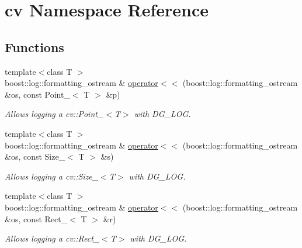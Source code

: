 \hypertarget{namespacecv}{}\section{cv Namespace Reference}
\label{namespacecv}
\subsection*{Functions}
\begin{DoxyCompactItemize}
\item 
{\footnotesize template$<$class T $>$ }\\boost\+::log\+::formatting\+\_\+ostream \& \hyperlink{group___imagery_module_ga4d7a2828ed1d678a96fa0ad0591c4103}{operator$<$$<$} (boost\+::log\+::formatting\+\_\+ostream \&os, const Point\+\_\+$<$ T $>$ \&p)
\begin{DoxyCompactList}\small\item\em Allows logging a cv\+::\+Point\+\_\+$<$\+T$>$ with D\+G\+\_\+\+L\+OG. \end{DoxyCompactList}\item 
{\footnotesize template$<$class T $>$ }\\boost\+::log\+::formatting\+\_\+ostream \& \hyperlink{group___imagery_module_ga0656a5315cde33b97aa201d95d1a285f}{operator$<$$<$} (boost\+::log\+::formatting\+\_\+ostream \&os, const Size\+\_\+$<$ T $>$ \&s)
\begin{DoxyCompactList}\small\item\em Allows logging a cv\+::\+Size\+\_\+$<$\+T$>$ with D\+G\+\_\+\+L\+OG. \end{DoxyCompactList}\item 
{\footnotesize template$<$class T $>$ }\\boost\+::log\+::formatting\+\_\+ostream \& \hyperlink{group___imagery_module_gae1a3630bfbc5f81997647209bc6fcc38}{operator$<$$<$} (boost\+::log\+::formatting\+\_\+ostream \&os, const Rect\+\_\+$<$ T $>$ \&r)
\begin{DoxyCompactList}\small\item\em Allows logging a cv\+::\+Rect\+\_\+$<$\+T$>$ with D\+G\+\_\+\+L\+OG. \end{DoxyCompactList}\end{DoxyCompactItemize}
